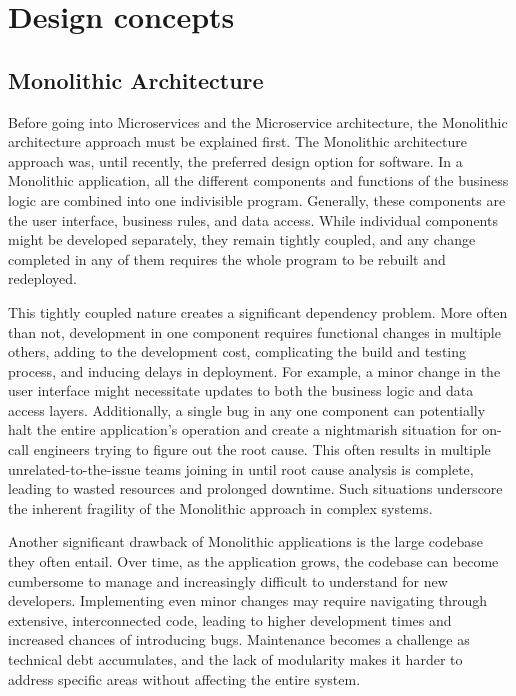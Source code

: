 \chapter{Design concepts} \label{ch:design_concepts}

\section{Monolithic Architecture}
 
Before going into Microservices and the Microservice architecture, the Monolithic architecture approach must be explained first. The Monolithic architecture approach was, until recently, the preferred design option for software. In a Monolithic application, all the different components and functions of the business logic are combined into one indivisible program\cite{monovsmicro}. Generally, these components are the user interface, business rules, and data access. While individual components might be developed separately, they remain tightly coupled\cite{whatismono}, and any change completed in any of them requires the whole program to be rebuilt and redeployed\cite{app10175797}.

This tightly coupled nature creates a significant dependency problem. More often than not, development in one component requires functional changes in multiple others, adding to the development cost, complicating the build and testing process, and inducing delays in deployment. For example, a minor change in the user interface might necessitate updates to both the business logic and data access layers. Additionally, a single bug in any one component can potentially halt the entire application's operation and create a nightmarish situation for on-call engineers trying to figure out the root cause. This often results in multiple unrelated-to-the-issue teams joining in until root cause analysis is complete, leading to wasted resources and prolonged downtime. Such situations underscore the inherent fragility of the Monolithic approach in complex systems. 

Another significant drawback of Monolithic applications is the large codebase they often entail. Over time, as the application grows, the codebase can become cumbersome to manage and increasingly difficult to understand for new developers\cite{whatismono}. Implementing even minor changes may require navigating through extensive, interconnected code, leading to higher development times and increased chances of introducing bugs. Maintenance becomes a challenge as technical debt accumulates, and the lack of modularity makes it harder to address specific areas without affecting the entire system. 

